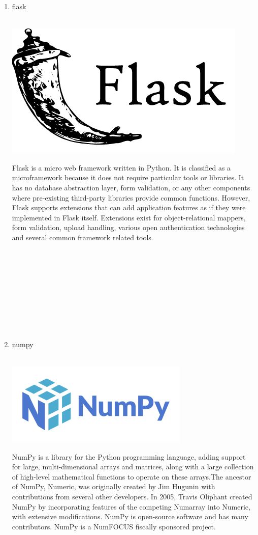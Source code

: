 \documentclass[conference]{IEEEtran}
\begin{document}
\begin{enumerate}
 \break
   
    \item flask\\ \\
    \centerline{\includegraphics[scale=0.5]{assets/flask.png}}
    Flask is a micro web framework written in Python. It is classified as a microframework because it does not require particular tools or libraries. It has no database abstraction layer, form validation, or any other components where pre-existing third-party libraries provide common functions. However, Flask supports extensions that can add application features as if they were implemented in Flask itself. Extensions exist for object-relational mappers, form validation, upload handling, various open authentication technologies and several common framework related tools. \\ \\ \\ \\ \\ \\ \\ \\ \\ \\
 
    \item numpy \\ \\
    \centerline{\includegraphics[scale=0.5]{assets/numpy.png}}
    NumPy is a library for the Python programming language, adding support for large, multi-dimensional arrays and matrices, along with a large collection of high-level mathematical functions to operate on these arrays.The ancestor of NumPy, Numeric, was originally created by Jim Hugunin with contributions from several other developers. In 2005, Travis Oliphant created NumPy by incorporating features of the competing Numarray into Numeric, with extensive modifications. NumPy is open-source software and has many contributors. NumPy is a NumFOCUS fiscally sponsored project. 


\end{enumerate}
\end{document}
